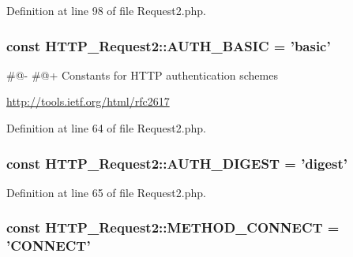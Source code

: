 Definition at line 98 of file Request2.\-php.

\hypertarget{classHTTP__Request2_a2282d82f67f929d936b2b2b6c2317dd1}{
\subsubsection[{A\-U\-T\-H\-\_\-\-B\-A\-S\-I\-C}]{\setlength{\rightskip}{0pt plus 5cm}const H\-T\-T\-P\-\_\-\-Request2\-::\-A\-U\-T\-H\-\_\-\-B\-A\-S\-I\-C = 'basic'}}\label{classHTTP__Request2_a2282d82f67f929d936b2b2b6c2317dd1}
\#@-\/ \#@+ Constants for H\-T\-T\-P authentication schemes

\hyperlink{}{http\-://tools.\-ietf.\-org/html/rfc2617}

Definition at line 64 of file Request2.\-php.

\hypertarget{classHTTP__Request2_a4b05b6842e05183dc3ac3c7ff613b3c7}{
\subsubsection[{A\-U\-T\-H\-\_\-\-D\-I\-G\-E\-S\-T}]{\setlength{\rightskip}{0pt plus 5cm}const H\-T\-T\-P\-\_\-\-Request2\-::\-A\-U\-T\-H\-\_\-\-D\-I\-G\-E\-S\-T = 'digest'}}\label{classHTTP__Request2_a4b05b6842e05183dc3ac3c7ff613b3c7}


Definition at line 65 of file Request2.\-php.

\hypertarget{classHTTP__Request2_af03c573103c3f5bdf3ec9c3e95a08e59}{
\subsubsection[{M\-E\-T\-H\-O\-D\-\_\-\-C\-O\-N\-N\-E\-C\-T}]{\setlength{\rightskip}{0pt plus 5cm}const H\-T\-T\-P\-\_\-\-Request2\-::\-M\-E\-T\-H\-O\-D\-\_\-\-C\-O\-N\-N\-E\-C\-T = 'C\-O\-N\-N\-E\-C\-T'}}\label{classHTTP__Request2_af03c573103c3f5bdf3ec9c3e95a08e59}


